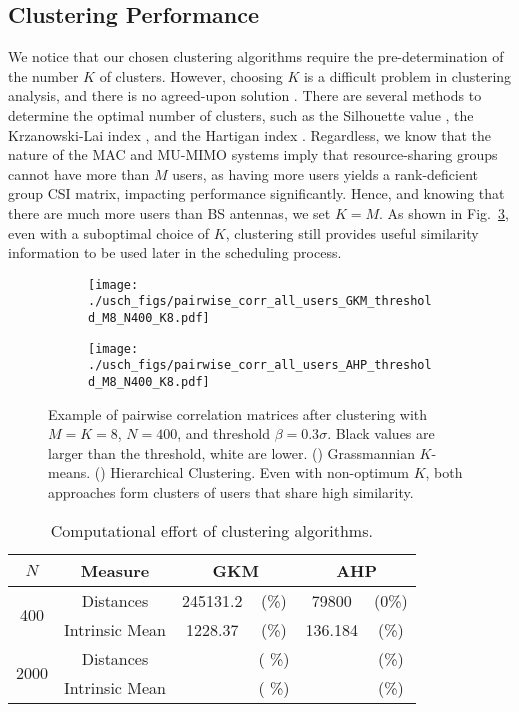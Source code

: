\subsection{Clustering Performance}

We notice that our chosen clustering algorithms require the pre-determination of the number $K$ of clusters. However, choosing $K$ is a difficult problem in clustering analysis, and there is no agreed-upon solution \cite{gap}. There are several methods to determine the optimal number of clusters, such as the Silhouette value \cite{silhouette}, the Krzanowski-Lai index \cite{Lai}, and the Hartigan index \cite{Hartigan}. Regardless, we know that the nature of the MAC and MU-MIMO systems imply that resource-sharing groups cannot have more than $M$ users, as having more users yields a rank-deficient group CSI matrix, impacting performance significantly. Hence, and knowing that there are much more users than BS antennas, we set $K=M$. As shown in Fig.~\ref{fig:clusters_pwc_M8_N400}, even with a suboptimal choice of $K$, clustering still provides useful similarity information to be used later in the scheduling process.

\begin{figure}[tb]
	\centering
	\begin{subfigure}[b]{0.49\linewidth}
		\texttt{[image: ./usch\_figs/pairwise\_corr\_all\_users\_GKM\_threshold\_M8\_N400\_K8.pdf]}
		\label{fig:pwc_gkm}
	\end{subfigure}\hfill
	\begin{subfigure}[b]{0.49\linewidth}
		\texttt{[image: ./usch\_figs/pairwise\_corr\_all\_users\_AHP\_threshold\_M8\_N400\_K8.pdf]}
		 \label{fig:pwc_AHP}
	\end{subfigure}\hfill
	\caption{Example of pairwise correlation matrices after clustering with $M=K=8$, $N=400$, and threshold $\beta=0.3\sigma$. Black values are larger than the threshold, white are lower. 
		() Grassmannian $K$-means. () Hierarchical Clustering. Even with non-optimum $K$, both approaches form clusters of users that share high similarity.}
	\label{fig:clusters_pwc_M8_N400}
\end{figure}


\begin{table}[h]
	\centering    
	\caption{Computational effort of clustering algorithms.}
	\label{tab:clustering_complexity_v}
	\begin{tabular}{c|c|cc|cc}
		$N$ & Measure & \multicolumn{2}{c|}{GKM} & \multicolumn{2}{c}{AHP} \\\hline
		\multirow{2}{*}{400}
		& Distances & 245131.2 & (\%)  & 79800 &(0\%)  \\ \cline{2-6}
		& Intrinsic Mean & 1228.37 &(\%)  & 136.184 &(\%)  \\ \hline
		\multirow{2}{*}{2000}
		& Distances &   & ( \%)  &  & (\%)  \\ \cline{2-6}
		& Intrinsic Mean &  & ( \%) &  &(\%)  \\ \hline
	\end{tabular}
\end{table}


